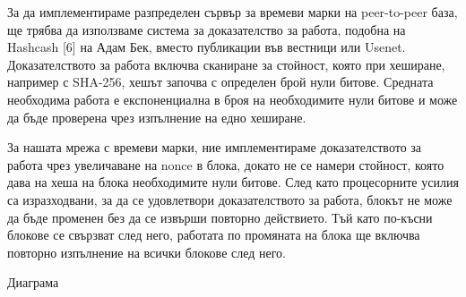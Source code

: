\documentclass[11pt,a4paper]{article}
\begin{document}
За да имплементираме разпределен сървър за времеви марки на peer-to-peer база, ще трябва да използваме система за доказателство за работа, подобна на Hashcash [6] на Адам Бек, вместо публикации във вестници или Usenet. Доказателството за работа включва сканиране за стойност, която при хеширане, например с SHA-256, хешът започва с определен брой нули битове. Средната необходима работа е експоненциална в броя на необходимите нули битове и може да бъде проверена чрез изпълнение на едно хеширане.

За нашата мрежа с времеви марки, ние имплементираме доказателството за работа чрез увеличаване на nonce в блока, докато не се намери стойност, която дава на хеша на блока необходимите нули битове. След като процесорните усилия са изразходвани, за да се удовлетвори доказателството за работа, блокът не може да бъде променен без да се извърши повторно действието. Тъй като по-късни блокове се свързват след него, работата по промяната на блока ще включва повторно изпълнение на всички блокове след него.

Диаграма
\end{document}
